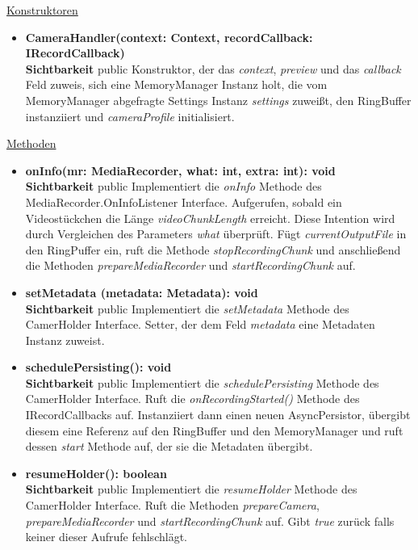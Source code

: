 \underline{Konstruktoren}
\begin{itemize}
\itemsep0pt
\item \textbf{CameraHandler(context: Context, recordCallback: IRecordCallback)} \hfill\\
\textbf{Sichtbarkeit} public\newline
Konstruktor, der das \textit{context}, \textit{preview} und das \textit{callback} Feld zuweis, sich eine MemoryManager Instanz holt, die vom MemoryManager abgefragte Settings Instanz \textit{settings} zuweißt, den RingBuffer instanziiert und \textit{cameraProfile} initialisiert.
\end{itemize}

\underline{Methoden}
\begin{itemize}
\itemsep0pt
\item \textbf{onInfo(mr: MediaRecorder, what: int, extra: int): void}\hfill\\
\textbf{Sichtbarkeit} public\newline
Implementiert die \textit{onInfo} Methode des MediaRecorder.OnInfoListener Interface. Aufgerufen, sobald ein Videostückchen die Länge \textit{videoChunkLength} erreicht. Diese Intention wird durch Vergleichen des Parameters \textit{what} überprüft. Fügt \textit{currentOutputFile} in den RingPuffer ein, ruft die Methode \textit{stopRecordingChunk} und anschließend die Methoden \textit{prepareMediaRecorder} und \textit{startRecordingChunk} auf.

\item \textbf{setMetadata (metadata: Metadata): void}\hfill\\
\textbf{Sichtbarkeit} public\newline
Implementiert die \textit{setMetadata} Methode des CamerHolder Interface. Setter, der dem Feld \textit{metadata} eine Metadaten Instanz zuweist.

\item \textbf{schedulePersisting(): void}\hfill\\
\textbf{Sichtbarkeit} public\newline
Implementiert die \textit{schedulePersisting} Methode des CamerHolder Interface. Ruft die \textit{onRecordingStarted()} Methode des IRecordCallbacks auf. Instanziiert dann einen neuen AsyncPersistor, übergibt diesem eine Referenz auf den RingBuffer und den MemoryManager und ruft dessen \textit{start} Methode auf, der sie die Metadaten übergibt.

\item \textbf{resumeHolder(): boolean}\hfill\\
\textbf{Sichtbarkeit} public\newline
Implementiert die \textit{resumeHolder} Methode des CamerHolder Interface. Ruft die Methoden \textit{prepareCamera}, \textit{prepareMediaRecorder} und \textit{startRecordingChunk} auf. Gibt \textit{true} zurück falls keiner dieser Aufrufe fehlschlägt.


\end{itemize}
